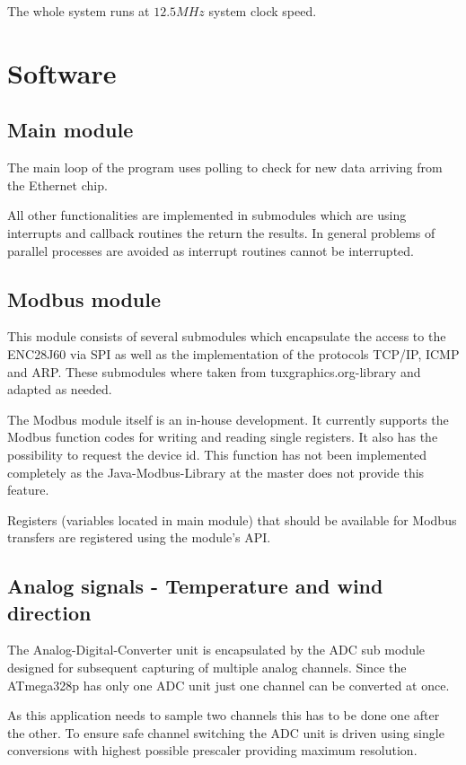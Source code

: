 The whole system runs at $12.5 MHz$ system clock speed.

\section{Software}

\subsection{Main module}
The main loop of the program uses polling to check for new data arriving from the Ethernet chip.

All other functionalities are implemented in submodules which are using interrupts and callback routines the return the results. In general problems of parallel processes are avoided as interrupt routines cannot be interrupted.

\subsection{Modbus module}
This module consists of several submodules which encapsulate the access to the ENC28J60 via SPI as well as the implementation of the protocols TCP/IP, ICMP and ARP. These submodules where taken from tuxgraphics.org-library and adapted as needed.

The Modbus module itself is an in-house development. It currently supports the Modbus function codes for writing and reading single registers. It also has the possibility to request the device id. This function has not been implemented completely as the Java-Modbus-Library at the master does not provide this feature.

Registers (variables located in main module) that should be available for Modbus transfers are registered using the module's API.

\subsection{Analog signals - Temperature and wind direction}
The Analog-Digital-Converter unit is encapsulated by the ADC sub module designed for subsequent capturing of multiple analog channels.
Since the ATmega328p has only one ADC unit just one channel can be converted at once.

As this application needs to sample two channels this has to be done one after the other. To ensure safe channel switching the ADC unit is driven using single conversions with highest possible prescaler providing maximum resolution.

